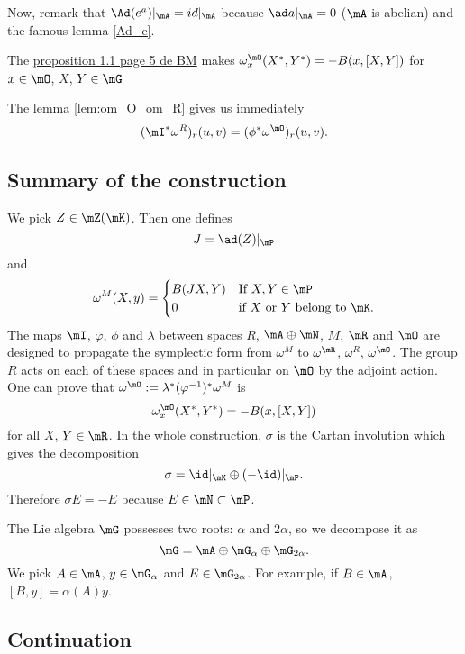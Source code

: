Now, remark that $\Ad(e^a)|_{\mA}=id|_{\mA}$ because $\ad a|_{\mA}=0$ ($\mA$ is abelian) and 
the famous lemma \ref{Ad_e}.

The \underline{proposition 1.1 page 5 de BM} makes $\omega_x^{\mO}(X^*,Y^*)=-B(x,[X,Y])$ for $x\in\mO$, $X$, $Y\in\mG$

The lemma \ref{lem:om_O_om_R} gives us immediately 
\[
   (\mI^*\omega^R)_r(u,v)=(\phi^*\omega^{\mO})_r(u,v).
\]
\subsection{Summary of the construction}

We pick $Z\in\mZ(\mK)$. Then one defines
\[ 
  J=\ad(Z)|_{\mP}
\]
and 
\[ 
  \omega^M(X,y)=
\begin{cases}
 B(JX,Y)&\text{If }X,Y\in\mP\\
 0&\text{if }X \text{ or } Y \text{ belong to }\mK. 
\end{cases}
\]
The maps $\mI$, $\varphi$, $\phi$ and $\lambda$ between spaces $R$, $\mA\oplus\mN$, $M$, $\mR$ and $\mO$ are designed to propagate the symplectic form from $\omega^M$ to $\omega^{\mR}$, $\omega^R$, $\omega^{\mO}$. The group $R$ acts on each of these spaces and in particular on $\mO$ by the adjoint action. One can prove that $\omega^{\mO}:=\lambda^*(\varphi^{-1})^*\omega^M$ is
\[ 
  \omega^{\mO}_x(X^*,Y^*)=-B(x,[X,Y])
\]
for all $X$, $Y\in\mR$. In the whole construction, $\sigma$ is the Cartan involution which gives the decomposition
\[ 
  \sigma=\id|_{\mK}\oplus(-\id)|_{\mP}.
\]
Therefore $\sigma E=-E$ because $E\in\mN\subset\mP$.

The Lie algebra $\mG$ possesses two roots: $\alpha$ and $2\alpha$, so we decompose it as 
\[ 
  \mG=\mA\oplus\mG_{\alpha}\oplus\mG_{2\alpha}.
\]
We pick $A\in\mA$, $y\in\mG_{\alpha}$ and $E\in\mG_{2\alpha}$. For example, if $B\in \mA$, $[B,y]=\alpha(A)y$.

\subsection{Continuation}

